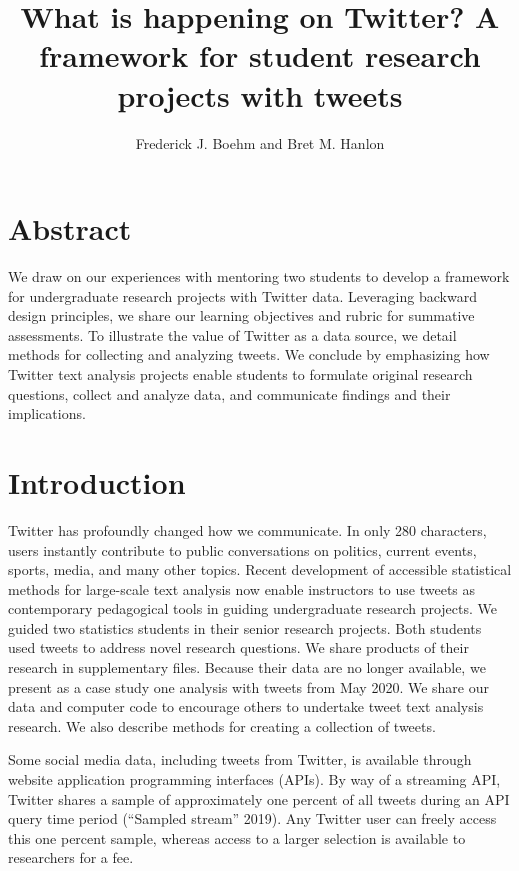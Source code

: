 \documentclass[
]{article}
\title{What is happening on Twitter? A framework for student research projects with tweets}
\author{Frederick J. Boehm and Bret M. Hanlon}
\date{}
\begin{document}
\maketitle

\hypertarget{abstract}{%
\section{Abstract}\label{abstract}}

We draw on our experiences with mentoring two students to develop a framework for undergraduate research projects with Twitter data.
Leveraging backward design principles, we share our learning objectives and
rubric for summative assessments. To illustrate the value of Twitter as a data source,
we detail methods for collecting and analyzing tweets. We conclude by emphasizing
how Twitter text analysis projects enable students to formulate
original research questions, collect and analyze data, and communicate
findings and their implications.

\hypertarget{introduction}{%
\section{Introduction}\label{introduction}}

Twitter has profoundly changed how we communicate.
In only 280 characters, users instantly contribute to public conversations on politics,
current events, sports, media, and many other topics.
Recent development of accessible statistical methods for large-scale text
analysis now enable instructors to use tweets as contemporary pedagogical
tools in guiding undergraduate research projects.
We guided two statistics students in their senior research projects.
Both students used tweets to address novel research questions. We
share products of their research in supplementary files. Because
their data are no longer available, we present as a case study one
analysis with tweets from May 2020. We share our data and computer
code to encourage others to undertake
tweet text analysis research. We also describe methods for creating a
collection of tweets.

Some social media data, including tweets from Twitter, is
available through website application programming interfaces (APIs).
By way of a streaming API, Twitter shares a sample of approximately
one percent of all
tweets during an API query time period (``Sampled stream'' 2019). Any Twitter
user can freely
access this one percent sample, whereas access to a larger selection is available to
researchers for a fee.
\end{document}
